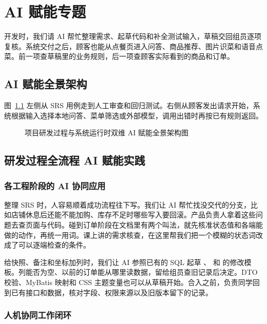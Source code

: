 \chapter{AI 赋能专题}\label{chap:ai}

开发时，我们请 AI 帮忙整理需求、起草代码和补全测试输入，草稿交回组员逐项复核。系统交付之后，顾客也能从点餐页进入问答、商品推荐、图片识菜和语音点菜。前一项查草稿里的业务规则，后一项查顾客实际看到的商品和订单。

\section{AI 赋能全景架构}

图~\ref{fig:ai-dual-arch} 左侧从 SRS 用例走到人工审查和回归测试。右侧从顾客发出请求开始，系统根据输入选择本地问答、菜单筛选或外部模型，调用出错时再按已有规则返回。

\begin{figure}[!htbp]
  \centering
  \resizebox{.96\linewidth}{!}{}
  \caption{项目研发过程与系统运行时双维 AI 赋能全景架构图}\label{fig:ai-dual-arch}
\end{figure}

\section{研发过程全流程 AI 赋能实践}

\subsection{各工程阶段的 AI 协同应用}

整理 SRS 时，人容易顺着成功流程往下写。我们让 AI 帮忙找没交代的分支，比如店铺休息后还能不能加购、库存不足时哪些写入要回滚。产品负责人拿着这些问题去查页面与代码。碰到订单阶段在文档里有两个叫法，就先核准状态值和各端能做的动作，再统一用词。课上讲的需求核查，在这里帮我们把一个模糊的状态词改成了可以逐端检查的条件。

给快照、备注和坐标加列时，我们让 AI 参照已有的 SQL 起草 、 和  的修改模板。列能否为空、以前的订单能从哪里读数据，留给组员查旧记录后决定。DTO 校验、MyBatis 映射和 CSS 主题变量也可以从草稿开始。合入之前，负责同学回到已有接口和数据，核对字段、权限来源以及旧版本留下的记录。

\subsection{人机协同工作闭环}

